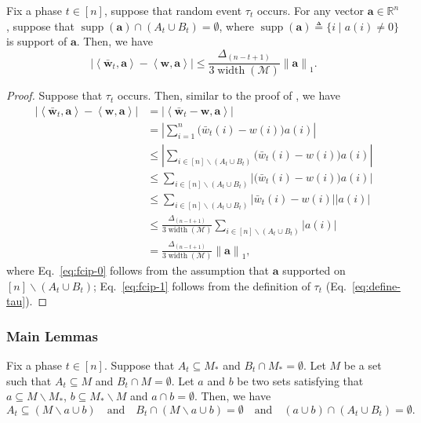 \documentclass{article}
\newcommand{\M}{\mathcal M}
\newcommand{\del}{\backslash}
\newcommand{\RR}{\mathbb R}
\DeclareMathOperator{\supp}{supp}
\DeclareMathOperator{\rank}{width}
\newcommand{\inn}[1]{\left\langle #1 \right\rangle}
\newcommand{\nor}[1]{\left\|#1\right\|}
\renewcommand{\vec}[1]{\boldsymbol{#1}}
\begin{document}
\begin{lemma}
Fix a phase $t\in[n]$, suppose that random event $\tau_t$ occurs.
For any vector $\vec a \in \RR^n$, suppose that $\supp(\vec a) \cap (A_t\cup B_t) = \emptyset$, where 
$\supp(\vec a) \triangleq \{i\;|\; a(i) \not=0\}$ is support of $\vec a$.
Then, we have
$$
\left| \inn{\vec{\bar w}_t, \vec a} - \inn{\vec w, \vec a} \right|
\le \frac{\Delta_{(n-t+1)}}{3\rank(\M)} \nor{\vec a}_1.
$$
\label{lemma:fbudget:ciproerty}
\end{lemma}

\begin{proof}
Suppose that $\tau_t$ occurs. 
Then, similar to the proof of , we have
\begin{align}
\left| \inn{\vec{\bar w}_t, \vec a} - \inn{\vec w, \vec a} \right|
&= \left| \inn{\vec{\bar w}_t-\vec w, \vec a} \right|  \nonumber \\
&= \left|\sum_{i=1}^n \big(\bar w_t(i)-w(i)\big) a(i) \right| \nonumber \\
&\le \left|\sum_{i\in[n]\del (A_t\cup B_t)} \big(\bar w_t(i)-w(i)\big) a(i) \right| \label{eq:fcip-0} \\
&\le \sum_{i\in[n]\del (A_t\cup B_t)} \left| \big(\bar w_t(i)-w(i)\big) a(i)\right| \nonumber\\
&\le \sum_{i\in[n]\del (A_t\cup B_t)} \left|\bar w_t(i)-w(i)\right| |a(i)| \nonumber\\
&\le \frac{\Delta_{(n-t+1)}}{3\rank(\M)} \sum_{i\in[n]\del (A_t\cup B_t)} |a(i)| \label{eq:fcip-1}\\
&= \frac{\Delta_{(n-t+1)}}{3\rank(\M)} \nor{\vec a}_1, \nonumber
\end{align}
where Eq.~\eqref{eq:fcip-0} follows from the assumption that $\vec a$ supported on $[n] \del (A_t\cup B_t)$;
Eq.~\eqref{eq:fcip-1} follows from the definition of $\tau_t$ (Eq.~\eqref{eq:define-tau}).
\end{proof}

\subsubsection{Main Lemmas}


\begin{lemma}
Fix a phase $t\in[n]$. Suppose that $A_t\subseteq M_*$ and $B_t \cap M_* = \emptyset$.
Let $M$ be a set such that $A_t \subseteq M$ and $B_t \cap M = \emptyset$.
Let $a$ and $b$ be two sets satisfying that $a \subseteq M\del M_*$, $b \subseteq M_* \del M$ and $a\cap b = \emptyset$.
Then, we have
$$
A_t \subseteq (M \del a \cup b) \quad\text{and}\quad B_t \cap (M \del a \cup b) = \emptyset
\quad\text{and}\quad (a\cup b)\cap (A_t\cup B_t) = \emptyset.
$$
\label{lemma:set-tech}
\end{lemma}
\end{document}
